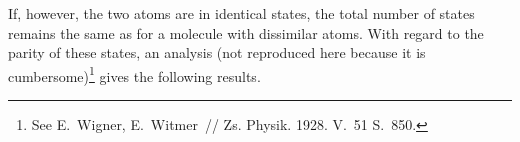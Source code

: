 If, however, the two atoms are in identical states, the total number of states remains the same as for a molecule with dissimilar atoms. With regard to the parity of these states, an analysis (not reproduced here because it is cumbersome)\footnote{See E.~Wigner, E.~Witmer~// Zs. Physik. 1928. V.~51 S.~850.} gives the following results.
